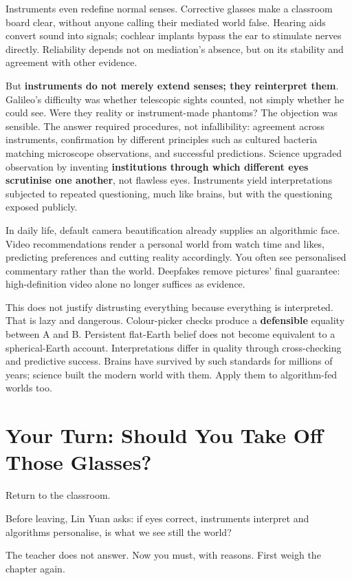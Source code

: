 Instruments even redefine normal senses. Corrective glasses make a classroom board clear, without anyone calling their mediated world false. Hearing aids convert sound into signals; cochlear implants bypass the ear to stimulate nerves directly. Reliability depends not on mediation's absence, but on its stability and agreement with other evidence.

But \textbf{instruments do not merely extend senses; they reinterpret them}. Galileo's difficulty was whether telescopic sights counted, not simply whether he could see. Were they reality or instrument-made phantoms? The objection was sensible. The answer required procedures, not infallibility: agreement across instruments, confirmation by different principles such as cultured bacteria matching microscope observations, and successful predictions. Science upgraded observation by inventing \textbf{institutions through which different eyes scrutinise one another}, not flawless eyes. Instruments yield interpretations subjected to repeated questioning, much like brains, but with the questioning exposed publicly.

In daily life, default camera beautification already supplies an algorithmic face. Video recommendations render a personal world from watch time and likes, predicting preferences and cutting reality accordingly. You often see personalised commentary rather than the world. Deepfakes remove pictures' final guarantee: high-definition video alone no longer suffices as evidence.

This does not justify distrusting everything because everything is interpreted. That is lazy and dangerous. Colour-picker checks produce a \textbf{defensible} equality between A and B. Persistent flat-Earth belief does not become equivalent to a spherical-Earth account. Interpretations differ in quality through cross-checking and predictive success. Brains have survived by such standards for millions of years; science built the modern world with them. Apply them to algorithm-fed worlds too.

\section[Your Turn: Remove the Glasses?]{Your Turn: Should You Take Off Those Glasses?}
Return to the classroom.

Before leaving, Lin Yuan asks: if eyes correct, instruments interpret and algorithms personalise, is what we see still the world?

The teacher does not answer. Now you must, with reasons. First weigh the chapter again.

